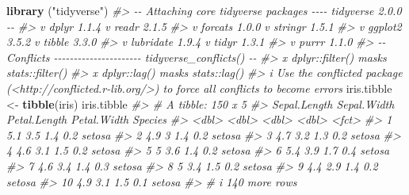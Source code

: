 \documentclass[
]{book}
\newenvironment{Shaded}{\begin{snugshade}}{\end{snugshade}}
\newcommand{\CommentTok}[1]{\textcolor[rgb]{0.56,0.35,0.01}{\textit{#1}}}
\newcommand{\FunctionTok}[1]{\textcolor[rgb]{0.13,0.29,0.53}{\textbf{#1}}}
\newcommand{\NormalTok}[1]{#1}
\newcommand{\OtherTok}[1]{\textcolor[rgb]{0.56,0.35,0.01}{#1}}
\newcommand{\StringTok}[1]{\textcolor[rgb]{0.31,0.60,0.02}{#1}}
\begin{document}
\begin{Shaded}
\begin{Highlighting}[]
\FunctionTok{library}\NormalTok{ (}\StringTok{"tidyverse"}\NormalTok{)}
\CommentTok{\#\textgreater{} {-}{-} Attaching core tidyverse packages {-}{-}{-}{-} tidyverse 2.0.0 {-}{-}}
\CommentTok{\#\textgreater{} v dplyr     1.1.4     v readr     2.1.5}
\CommentTok{\#\textgreater{} v forcats   1.0.0     v stringr   1.5.1}
\CommentTok{\#\textgreater{} v ggplot2   3.5.2     v tibble    3.3.0}
\CommentTok{\#\textgreater{} v lubridate 1.9.4     v tidyr     1.3.1}
\CommentTok{\#\textgreater{} v purrr     1.1.0     }
\CommentTok{\#\textgreater{} {-}{-} Conflicts {-}{-}{-}{-}{-}{-}{-}{-}{-}{-}{-}{-}{-}{-}{-}{-}{-}{-}{-}{-}{-}{-} tidyverse\_conflicts() {-}{-}}
\CommentTok{\#\textgreater{} x dplyr::filter() masks stats::filter()}
\CommentTok{\#\textgreater{} x dplyr::lag()    masks stats::lag()}
\CommentTok{\#\textgreater{} i Use the conflicted package (\textless{}http://conflicted.r{-}lib.org/\textgreater{}) to force all conflicts to become errors}
\NormalTok{iris.tibble }\OtherTok{\textless{}{-}} \FunctionTok{tibble}\NormalTok{(iris)}
\NormalTok{iris.tibble}
\CommentTok{\#\textgreater{} \# A tibble: 150 x 5}
\CommentTok{\#\textgreater{}    Sepal.Length Sepal.Width Petal.Length Petal.Width Species}
\CommentTok{\#\textgreater{}           \textless{}dbl\textgreater{}       \textless{}dbl\textgreater{}        \textless{}dbl\textgreater{}       \textless{}dbl\textgreater{} \textless{}fct\textgreater{}  }
\CommentTok{\#\textgreater{}  1          5.1         3.5          1.4         0.2 setosa }
\CommentTok{\#\textgreater{}  2          4.9         3            1.4         0.2 setosa }
\CommentTok{\#\textgreater{}  3          4.7         3.2          1.3         0.2 setosa }
\CommentTok{\#\textgreater{}  4          4.6         3.1          1.5         0.2 setosa }
\CommentTok{\#\textgreater{}  5          5           3.6          1.4         0.2 setosa }
\CommentTok{\#\textgreater{}  6          5.4         3.9          1.7         0.4 setosa }
\CommentTok{\#\textgreater{}  7          4.6         3.4          1.4         0.3 setosa }
\CommentTok{\#\textgreater{}  8          5           3.4          1.5         0.2 setosa }
\CommentTok{\#\textgreater{}  9          4.4         2.9          1.4         0.2 setosa }
\CommentTok{\#\textgreater{} 10          4.9         3.1          1.5         0.1 setosa }
\CommentTok{\#\textgreater{} \# i 140 more rows}
\end{Highlighting}
\end{Shaded}
\end{document}
